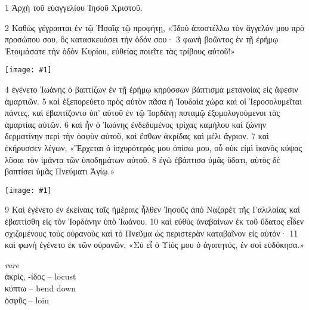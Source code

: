\documentclass[10pt,a5paper,twoside,twocolumn]{book}
\newcommand{\newchapter}{\stepcounter{chapter}}
\newcommand{\fig}[1]{\texttt{[image: \#1]}\label{fig:#1}}
\newcommand*\cleartoleftpage{%
  \ifodd\value{page}\hbox{}\clearpage\fi
}
\newenvironment{facing}{\cleartoleftpage}{\clearpage\pagebreak}
\newenvironment{help}{\clearpage}{}
\newenvironment{helpsec}{\begin{minipage}[t]{\textwidth}\begin{multicols}{2}}{\end{multicols}\end{minipage}}
\newenvironment{vocab}{\begin{helpsec}}{\end{helpsec}}
\begin{document}

\newchapter

\begin{facing}

1 Ἀρχὴ τοῦ εὐαγγελίου Ἰησοῦ Χριστοῦ.

2 Καθὼς γέγραπται ἐν τῷ Ἡσαΐᾳ τῷ προφήτῃ,
	«Ἰδοὺ ἀποστέλλω τὸν ἄγγελόν μου πρὸ προσώπου σου, 
	ὃς κατασκευάσει τὴν ὁδόν σου·
		3 φωνὴ βοῶντος ἐν τῇ ἐρήμῳ 
	Ἑτοιμάσατε τὴν ὁδὸν Κυρίου, 
	εὐθείας ποιεῖτε τὰς τρίβους αὐτοῦ!»

\fig{01-04} %

4 ἐγένετο Ἰωάνης ὁ βαπτίζων ἐν τῇ ἐρήμῳ κηρύσσων βάπτισμα μετανοίας εἰς ἄφεσιν ἁμαρτιῶν. 5 καὶ ἐξεπορεύετο πρὸς αὐτὸν πᾶσα ἡ Ἰουδαία χώρα καὶ οἱ Ἱεροσολυμεῖται πάντες, καὶ ἐβαπτίζοντο ὑπ’ αὐτοῦ ἐν τῷ Ἰορδάνῃ ποταμῷ ἐξομολογούμενοι τὰς ἁμαρτίας αὐτῶν. 6 καὶ ἦν ὁ Ἰωάνης ἐνδεδυμένος τρίχας καμήλου καὶ ζώνην δερματίνην περὶ τὴν ὀσφὺν αὐτοῦ, καὶ ἔσθων ἀκρίδας καὶ μέλι ἄγριον. 7 καὶ ἐκήρυσσεν λέγων, «Ἔρχεται ὁ ἰσχυρότερός μου ὀπίσω μου, οὗ οὐκ εἰμὶ ἱκανὸς κύψας λῦσαι τὸν ἱμάντα τῶν ὑποδημάτων αὐτοῦ. 8 ἐγὼ ἐβάπτισα ὑμᾶς ὕδατι, αὐτὸς δὲ βαπτίσει ὑμᾶς Πνεύματι Ἁγίῳ.»

\fig{01-09} %

	9 Καὶ ἐγένετο ἐν ἐκείναις ταῖς ἡμέραις ἦλθεν Ἰησοῦς ἀπὸ Ναζαρὲτ τῆς Γαλιλαίας καὶ ἐβαπτίσθη εἰς τὸν Ἰορδάνην ὑπὸ Ἰωάνου. 10 καὶ εὐθὺς ἀναβαίνων ἐκ τοῦ ὕδατος εἶδεν σχιζομένους τοὺς οὐρανοὺς καὶ τὸ Πνεῦμα ὡς περιστερὰν καταβαῖνον εἰς αὐτόν· 
11 καὶ φωνὴ ἐγένετο ἐκ τῶν οὐρανῶν, «Σὺ εἶ ὁ Υἱός μου ὁ ἀγαπητός, ἐν σοὶ εὐδόκησα.»


\begin{help}

\begin{vocab}

\emph{rare}\\
ἀκρίς, -ίδος -- locust \\
κύπτω -- bend down\\
ὀσφῦς -- loin\\


\end{vocab}
\end{help}
\end{facing}
\end{document}
